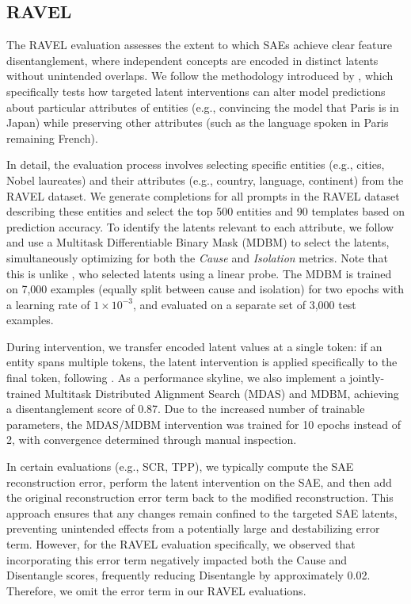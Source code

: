 \documentclass{article}
\theoremstyle{plain}
\theoremstyle{definition}
\theoremstyle{remark}
\begin{document}
\subsection*{RAVEL}

The RAVEL evaluation assesses the extent to which SAEs achieve clear feature disentanglement, where independent concepts are encoded in distinct latents without unintended overlaps. We follow the methodology introduced by \citet{huang2024ravelevaluatinginterpretabilitymethods}, which specifically tests how targeted latent interventions can alter model predictions about particular attributes of entities (e.g., convincing the model that Paris is in Japan) while preserving other attributes (such as the language spoken in Paris remaining French).

In detail, the evaluation process involves selecting specific entities (e.g., cities, Nobel laureates) and their attributes (e.g., country, language, continent) from the RAVEL dataset. We generate completions for all prompts in the RAVEL dataset describing these entities and select the top 500 entities and 90 templates based on prediction accuracy. To identify the latents relevant to each attribute, we follow \citet{chaudhary2024evaluatingopensourcesparseautoencoders} and use a Multitask Differentiable Binary Mask (MDBM) to select the latents, simultaneously optimizing for both the \textit{Cause} and \textit{Isolation} metrics. Note that this is unlike \citet{huang2024ravelevaluatinginterpretabilitymethods}, who selected latents using a linear probe. The MDBM is trained on 7,000 examples (equally split between cause and isolation) for two epochs with a learning rate of $1 \times 10^{-3}$, and evaluated on a separate set of 3,000 test examples.

During intervention, we transfer encoded latent values at a single token: if an entity spans multiple tokens, the latent intervention is applied specifically to the final token, following \citet{huang2024ravelevaluatinginterpretabilitymethods}. As a performance skyline, we also implement a jointly-trained Multitask Distributed Alignment Search (MDAS) and MDBM, achieving a disentanglement score of 0.87. Due to the increased number of trainable parameters, the MDAS/MDBM intervention was trained for 10 epochs instead of 2, with convergence determined through manual inspection.

In certain evaluations (e.g., SCR, TPP), we typically compute the SAE reconstruction error, perform the latent intervention on the SAE, and then add the original reconstruction error term back to the modified reconstruction. This approach ensures that any changes remain confined to the targeted SAE latents, preventing unintended effects from a potentially large and destabilizing error term. However, for the RAVEL evaluation specifically, we observed that incorporating this error term negatively impacted both the Cause and Disentangle scores, frequently reducing Disentangle by approximately 0.02. Therefore, we omit the error term in our RAVEL evaluations.
\end{document}
